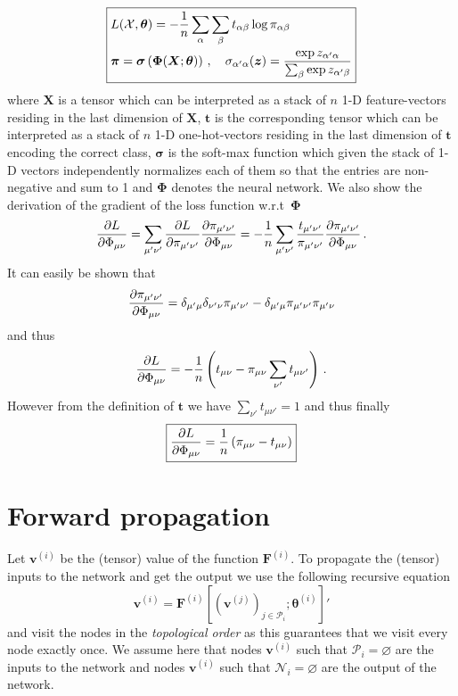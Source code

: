 \documentclass{myclass}
\begin{document}
\[
\boxed
{
\begin{split}
   & L(\mathcal{X}, \bm{\theta}) = -\frac{1}{n}\sum_{\alpha}\sum_{\beta} t_{\alpha\beta} \log \pi_{\alpha\beta}\\
   & \bm{\pi} = \bm{\sigma}\left( \bm{\Phi}(\bm{X};\bm{\theta}) \right)\,,\quad \sigma_{\alpha'\alpha}(\bm{z}) = \frac{\exp z_{\alpha'\alpha}}{\sum_{\beta} \exp z_{\alpha'\beta}}
\end{split}
}
\] 
where \(\bm{X}\) is a tensor which can be interpreted as a stack of \(n\) 1-D feature-vectors
residing in the last dimension of \(\bm{X}\), \(\bm{t}\) is the corresponding tensor which can be
interpreted as a stack of \(n\) 1-D one-hot-vectors residing in the last dimension of \(\bm{t}\)
encoding the correct class, \(\bm{\sigma}\) is the soft-max function which given the stack of 1-D
vectors independently normalizes each of them so that the entries are non-negative and sum to 1 and
\(\bm{\Phi}\) denotes the neural network. We also show the derivation of the gradient of the loss
function w.r.t~\(\bm{\Phi}\)
\[
   \pdv{L}{\Phi_{\mu\nu}} = \sum_{\mu'\nu'} \pdv{L}{\pi_{\mu'\nu'}} \pdv{\pi_{\mu'\nu'}}{\Phi_{\mu\nu}} = -\frac{1}{n}\sum_{\mu'\nu'} \frac{t_{\mu'\nu'}}{\pi_{\mu'\nu'}} \pdv{\pi_{\mu'\nu'}}{\Phi_{\mu\nu}}\,.
\]
It can easily be shown that
\[
   \pdv{\pi_{\mu'\nu'}}{\Phi_{\mu\nu}} = \delta_{\mu'\mu} \delta_{\nu'\nu} \pi_{\mu'\nu'} - \delta_{\mu'\mu} \pi_{\mu'\nu'} \pi_{\mu' \nu}
\]
and thus
\[
   \pdv{L}{\Phi_{\mu\nu}} = -\frac{1}{n} \left( t_{\mu\nu} - \pi_{\mu\nu} \sum_{\nu'} t_{\mu\nu'} \right)\,.
\]
However from the definition of \(\bm{t}\) we have \(\sum_{\nu'} t_{\mu\nu'} = 1\) and thus finally
\[
\boxed{\pdv{L}{\Phi_{\mu\nu}} = \frac{1}{n} \left( \pi_{\mu\nu} - t_{\mu\nu} \right)}
\]

\section{Forward propagation}

Let \(\bm{v}^{(i)}\) be the (tensor) value of the function \(\bm{F}^{(i)}\). To propagate the
(tensor) inputs to the network and get the output we use the following recursive equation
\[
\boxed{ \bm{v}^{(i)} = \bm{F}^{(i)} \left[ \left(\bm{v}^{(j)}\right)_{j \in \mathscr{P}_i} ; \bm{\theta}^{(i)} \right] }'
\] 
and visit the nodes in the \emph{topological order} as this guarantees that we visit every node
exactly once. We assume here that nodes \(\bm{v}^{(i)}\) such that \(\mathscr{P}_i = \varnothing\)
are the inputs to the network and nodes \(\bm{v}^{(i)}\) such that \(\mathscr{N}_i = \varnothing\)
are the output of the network.
\end{document}
